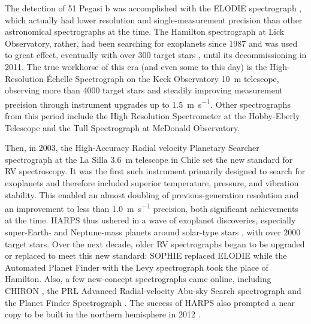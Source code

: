 The detection of 51 Pegasi b was accomplished with the ELODIE spectrograph \citep{baranne_elodie_1996}, which actually had lower resolution and single-measurement precision than other astronomical spectrographs at the time. The Hamilton spectrograph \citep{vogt_lick_1987} at Lick Observatory, rather, had been searching for exoplanets since 1987 and was used to great effect, eventually with over 300 target stars \citep{fischer_planetary_1999}, until its decommissioning in 2011. The true workhorse of this era (and even some to this day) is the High-Resolution \'Echelle Spectrograph \citep[HIRES;][]{vogt_hires_1994} on the Keck Observatory 10~m telescope, observing more than 4000 target stars and steadily improving measurement precision through instrument upgrades up to 1.5~\si{\meter\per\second}. Other spectrographs from this period include the High Resolution Spectrometer \citep[HRS;][]{tull_high-resolution_1998} at the Hobby-Eberly Telescope and the Tull Spectrograph \citep{tull_high-resolution_1995} at McDonald Observatory.

Then, in 2003, the High-Accuracy Radial velocity Planetary Searcher spectrograph \citep[HARPS;][]{pepe_harps_2002, mayor_setting_2003} at the La Silla 3.6~m telescope in Chile set the new standard for RV spectroscopy. It was the first such instrument primarily designed to search for exoplanets and therefore included superior temperature, pressure, and vibration stability. This enabled an almost doubling of previous-generation resolution and an improvement to less than 1.0~\si{\meter\per\second} precision, both significant achievements at the time. HARPS thus ushered in a wave of exoplanet discoveries, especially super-Earth- and Neptune-mass planets around solar-type stars \citep{pepe_harps_2011}, with over 2000 target stars. Over the next decade, older RV spectrographs began to be upgraded or replaced to meet this new standard: SOPHIE \citep{perruchot_sophie_2008} replaced ELODIE while the Automated Planet Finder with the Levy spectrograph \citep[APF+Levy;][]{vogt_apflick_2014} took the place of Hamilton. Also, a few new-concept spectrographs came online, including CHIRON \citep{tokovinin_chironfiber_2013}, the PRL Advanced Radial-velocity Abu-sky Search spectrograph \citep[PARAS;][]{chakraborty_first_2010, chakraborty_prl_2014} and the Planet Finder Spectrograph \citep[PFS;][]{crane_carnegie_2006}. The success of HARPS also prompted a near copy to be built in the northern hemisphere in 2012 \citep[HARPS-N;][]{cosentino_harps-n_2014}.

